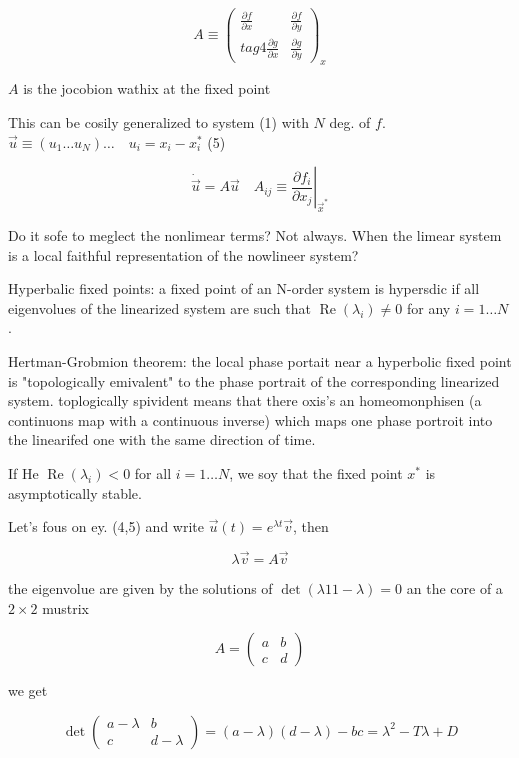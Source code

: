 \[
A \equiv\left(\begin{array}{ll}
\frac{\partial f}{\partial x} & \frac{\partial f}{\partial y}  \\tag{4}
\frac{\partial g}{\partial x} & \frac{\partial g}{\partial y}
\end{array}\right)_{x}
\]

$A$ is the jocobion wathix at the fixed point

This can be cosily generalized to system (1) with $N$ deg. of $f$. $\vec{u} \equiv\left(u_{1} \ldots u_{N}\right) \ldots \quad u_{i}=x_{i}-x_{i}^{*}$
(5)

$$
\dot{\vec{u}}=\left.A \vec{u} \quad A_{i j} \equiv \frac{\partial f_{i}}{\partial x_{j}}\right|_{\vec{x}^{*}}
$$

Do it sofe to meglect the nonlimear terms? Not always. When the limear system is a local faithful representation of the nowlineer system?

Hyperbalic fixed points: a fixed point of an N-order system is hypersdic if all eigenvolues of the linearized system are such that $\operatorname{Re}\left(\lambda_{i}\right) \neq 0$ for any $i=1 \ldots N$.

Hertman-Grobmion theorem: the local phase portait near a hyperbolic fixed point is "topologically emivalent" to the phase portrait of the corresponding linearized system.
toplogically spivident means that there oxis's an homeomonphisen (a continuons map with a continuous inverse) which maps one phase portroit into the linearifed one with the same direction of time.

If He $\operatorname{Re}\left(\lambda_{i}\right)<0$ for all $i=1 \ldots N$, we soy that the fixed point $x^{*}$ is asymptotically stable.

Let's fous on ey. (4,5) and write $\vec{u}(t)=e^{\lambda t} \vec{v}$, then

$$
\lambda \vec{v}=A \vec{v}
$$

the eigenvolue are given by the solutions of $\operatorname{det}(\lambda 11-\lambda)=0$ an the core of a $2 \times 2$ mustrix

$$
A=\left(\begin{array}{ll}a & b \\c & d\end{array}\right)
$$

we get

$$
\operatorname{det}\left(\begin{array}{cc}a-\lambda & b \\c & d-\lambda\end{array}\right)=(a-\lambda)(d-\lambda)-b c=\lambda^{2}-T \lambda+D
$$

